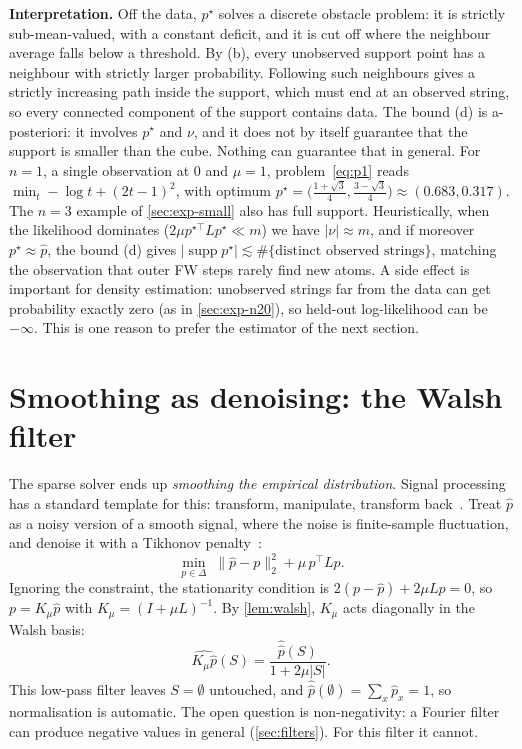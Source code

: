 \documentclass[11pt]{article}
\theoremstyle{definition}
\theoremstyle{remark}
\newcommand{\simplex}{\Delta}
\newcommand{\hp}{\hat p}
\newcommand{\wh}[1]{\widehat{#1}}
\newcommand{\supp}{\operatorname{supp}}
\begin{document}
\noindent
\textbf{Interpretation.} Off the data, $p^\star$ solves a discrete obstacle problem: it is strictly sub-mean-valued, with a constant deficit, and it is cut off where the neighbour average falls below a threshold. By (b), every unobserved support point has a neighbour with strictly larger probability. Following such neighbours gives a strictly increasing path inside the support, which must end at an observed string, so every connected component of the support contains data. The bound (d) is a-posteriori: it involves $p^\star$ and $\nu$, and it does not by itself guarantee that the support is smaller than the cube. Nothing can guarantee that in general. For $n=1$, a single observation at $0$ and $\mu=1$, problem~\eqref{eq:p1} reads $\min_t -\log t+(2t-1)^2$, with optimum $p^\star=\bigl(\tfrac{1+\sqrt3}{4},\tfrac{3-\sqrt3}{4}\bigr)\approx(0.683,0.317)$. The $n=3$ example of \cref{sec:exp-small} also has full support. Heuristically, when the likelihood dominates ($2\mu p^{\star\top} Lp^\star\ll m$) we have $|\nu|\approx m$, and if moreover $p^\star\approx\hp$, the bound (d) gives $|\supp p^\star|\lesssim\#\{\text{distinct observed strings}\}$, matching the observation that outer FW steps rarely find new atoms. A side effect is important for density estimation: unobserved strings far from the data can get probability exactly zero (as in \cref{sec:exp-n20}), so held-out log-likelihood can be $-\infty$. This is one reason to prefer the estimator of the next section.

\section{Smoothing as denoising: the Walsh filter}
\label{sec:p2}

The sparse solver ends up \emph{smoothing the empirical distribution}. Signal processing has a standard template for this: transform, manipulate, transform back~\cite{shuman2013graphsp}. Treat $\hp$ as a noisy version of a smooth signal, where the noise is finite-sample fluctuation, and denoise it with a Tikhonov penalty~\cite{tikhonov1977illposed}:
\begin{equation}\tag{P2}\label{eq:p2}
\min_{p\in\simplex}\;\|\hp-p\|_2^2+\mu\,p^\top Lp .
\end{equation}
Ignoring the constraint, the stationarity condition is $2(p-\hp)+2\mu Lp=0$, so $p=K_\mu\hp$ with $K_\mu=(I+\mu L)^{-1}$. By \cref{lem:walsh}, $K_\mu$ acts diagonally in the Walsh basis:
\begin{equation}\label{eq:tikhonov-filter}
\wh{K_\mu\hp}(S)=\frac{\wh\hp(S)}{1+2\mu|S|}.
\end{equation}
This low-pass filter leaves $S=\emptyset$ untouched, and $\wh\hp(\emptyset)=\sum_x\hp_x=1$, so normalisation is automatic. The open question is non-negativity: a Fourier filter can produce negative values in general (\cref{sec:filters}). For this filter it cannot.
\end{document}
